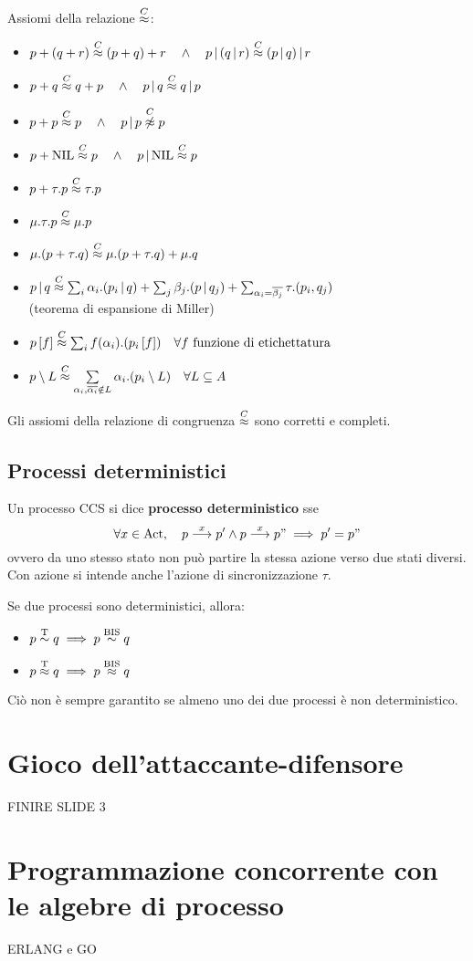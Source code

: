 Assiomi della relazione $\overset{C}{\approx}$:
\begin{itemize}
    \item $p+(q+r) \overset{C}{\approx} (p+q)+r \quad \land \quad
    p\,|\,(q\,|\,r) \overset{C}{\approx} (p\,|\,q)\,|\,r$
    \item $p+q \overset{C}{\approx} q+p \quad \land \quad p\,|\,q \overset{C}{\approx} q\,|\,p$
    \item $p+p \overset{C}{\approx} p \quad \land \quad p\,|\,p \overset{C}{\not\approx} p$
    \item $p+\text{NIL} \overset{C}{\approx} p \quad \land \quad p\,|\,\text{NIL} \overset{C}{\approx} p$
    \item $p+\tau .p \overset{C}{\approx} \tau .p$
    \item $\mu . \tau .p \overset{C}{\approx} \mu .p$
    \item $\mu .(p+ \tau .q) \overset{C}{\approx} \mu .(p+ \tau .q) + \mu .q$
    \item $p\,|\,q \overset{C}{\approx} \sum_i \alpha_i .(p_i \,|\,q) +
    \sum_j \beta_j .(p \,|\,q_j) + \sum_{\alpha_i = \overline{\beta_j}}
    \tau .(p_i, q_j)$ \\ (teorema di espansione di Miller)
    \item $p\left[f\right] \overset{C}{\approx} \sum_i f(\alpha_i).(p_i\left[f\right]) \quad
    \forall f \textnormal{ funzione di etichettatura}$
    \item $p \setminus L \overset{C}{\approx} \sum\limits_{\alpha_i, \overline{\alpha_i} \notin L}
    \alpha_i.(p_i \setminus L) \quad \forall L \subseteq A$
\end{itemize}
Gli assiomi della relazione di congruenza $\overset{C}{\approx}$ sono corretti e completi.

\subsection*{Processi deterministici}
\begin{defn}
    Un processo CCS si dice \textbf{processo deterministico} sse
    \[
        \forall x \in \text{Act}, \quad
        p \overset{x}{\longrightarrow} p' \land p \overset{x}{\longrightarrow} p" \implies p' = p"
    \]
    ovvero da uno stesso stato non può partire la stessa azione verso due stati
    diversi. Con azione si intende anche l'azione di sincronizzazione $\tau$.
\end{defn}

\begin{defn}
    Se due processi sono deterministici, allora:
    \begin{itemize}
        \item $p \overset{\textnormal{T}}{\sim} q \implies p \overset{\textnormal{BIS}}{\sim} q$
        \item $p \overset{\textnormal{T}}{\approx} q \implies p \overset{\textnormal{BIS}}{\approx} q$
    \end{itemize}
    Ciò non è sempre garantito se almeno uno dei due processi è non deterministico.
\end{defn}



\section{Gioco dell'attaccante-difensore}
FINIRE SLIDE 3


\section{Programmazione concorrente con le algebre di processo}
ERLANG e GO
